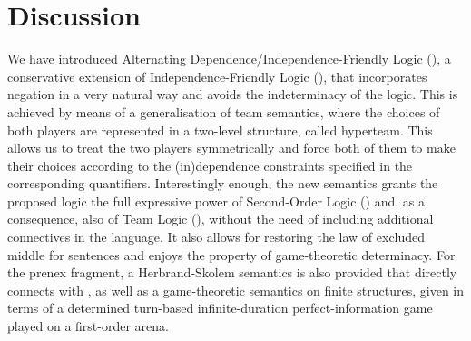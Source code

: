 \documentclass[authoryear]{elsarticle}
\begin{document}











\section{Discussion}

We have introduced Alternating Dependence/Independence-Friendly Logic (\ADIF), a
conservative extension of Independence-Friendly Logic (\IF), that incorporates
negation in a very natural way and avoids the indeterminacy of the logic.
This is achieved by means of a generalisation of team semantics, where the
choices of both players are represented in a two-level structure, called
hyperteam.
This allows us to treat the two players symmetrically and force both of them to
make their choices according to the (in)dependence constraints specified in the
corresponding quantifiers.
Interestingly enough, the new semantics grants the proposed logic the full
expressive power of Second-Order Logic (\SOL) and, as a consequence, also of
Team Logic (\TL), without the need of including additional connectives in the
language.
It also allows for restoring the law of excluded middle for sentences and enjoys
the property of game-theoretic determinacy.
For the prenex fragment, a Herbrand-Skolem semantics is also provided that
directly connects \ADIF with \SOL, as well as a game-theoretic semantics on
finite structures, given in terms of a determined turn-based infinite-duration
perfect-information game played on a first-order arena.
\end{document}
